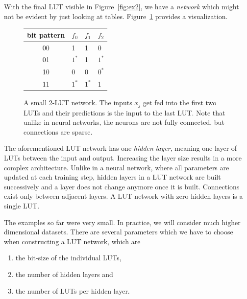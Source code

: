 \noindent With the final LUT visible in Figure~\ref{fig:ex2}, we have a \textit{network} which might not be evident by just looking at tables. Figure~\ref{fig:first_LUT_network} provides a visualization.

\begin{figure}[!htb]
    \centering
  \begin{minipage}[b]{.4\linewidth}
    \begin{tabular}{clll}
    bit pattern & $f_0$ & $f_1$ & $f_2$ \\ \hline
    00          & 1      & 1      & 0     \\
    01          & $1^*$  & 1      & $1^*$ \\
    10          & 0      & 0      & $0^*$ \\
    11          & $1^*$  & $1^*$ & 1    
    \end{tabular}
    \vspace{1.5em}
  \end{minipage}
    
\caption{A small 2-LUT network. The inputs $x_j$ get fed into the first two LUTs and their predictions is the input to the last LUT. Note that unlike in neural networks, the neurons are not fully connected, but connections are sparse.}
\label{fig:first_LUT_network}
\end{figure}
\FloatBarrier

\noindent The aforementioned LUT network has one \textit{hidden layer}, meaning one layer of LUTs between the input and output. Increasing the layer size results in a more complex architecture. Unlike in a neural network, where all parameters are updated at each training step, hidden layers in a LUT network are built successively and a layer does not change anymore once it is built. Connections exist only between adjacent layers. A LUT network with zero hidden layers is a single LUT.

\noindent The examples so far were very small. In practice, we will consider much higher dimensional datasets. There are several parameters which we have to choose when constructing a LUT network, which are

\vspace{0.5em}
\begin{enumerate}
    \item the bit-size of the individual LUTs,
    \item the number of hidden layers and
    \item the number of LUTs per hidden layer.
\end{enumerate}
\vspace{0.5em}


